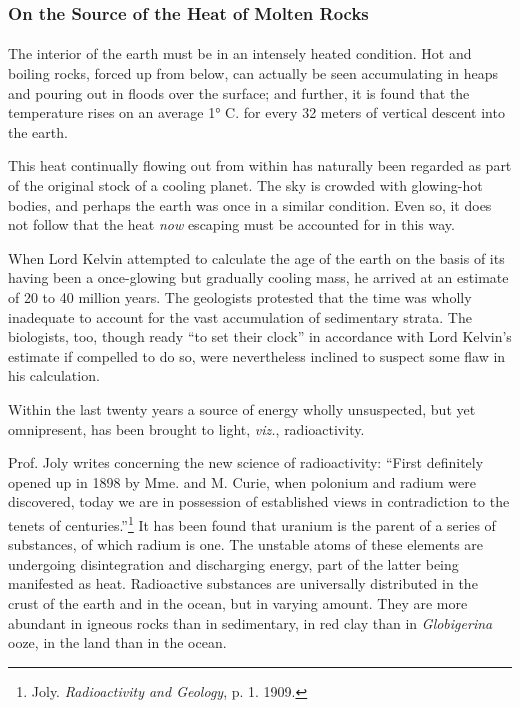 \documentclass[a4paper, 12pt, oneside, landscape]{article}
\begin{document}
\subsubsection{On the Source of the Heat of Molten Rocks}
\paragraph{}
The interior of the earth must be in an intensely heated condition. Hot and boiling rocks, forced up from below, can actually be seen accumulating in heaps and pouring out in floods over the surface; and further, it is found that the temperature rises on an average 1° C. for every 32 meters of vertical descent into the earth.

This heat continually flowing out from within has naturally been regarded as part of the original stock of a cooling planet. The sky is crowded with glowing-hot bodies, and perhaps the earth was once in a similar condition. Even so, it does not follow that the heat \emph{now} escaping must be accounted for in this way.

When Lord Kelvin attempted to calculate the age of the earth on the basis of its having been a once-glowing but gradually cooling mass, he arrived at an estimate of 20 to 40 million years. The geologists protested that the time was wholly inadequate to account for the vast accumulation of sedimentary strata. The biologists, too, though ready ``to set their clock'' in accordance with Lord Kelvin's estimate if compelled to do so, were nevertheless inclined to suspect some flaw in his calculation.

Within the last twenty years a source of energy wholly unsuspected, but yet omnipresent, has been brought to light, \emph{viz.}, radioactivity.

Prof. Joly writes concerning the new science of radioactivity: ``First definitely opened up in 1898 by Mme. and M. Curie, when polonium and radium were discovered, today we are in possession of established views in contradiction to the tenets of centuries.''\footnote{Joly. \emph{Radioactivity and Geology}, p. 1. 1909.} It has been found that uranium is the parent of a series of substances, of which radium is one. The unstable atoms of these elements are undergoing disintegration and discharging energy, part of the latter being manifested as heat. Radioactive substances are universally distributed in the crust of the earth and in the ocean, but in varying amount. They are more abundant in igneous rocks than in sedimentary, in red clay than in \emph{Globigerina} ooze, in the land than in the ocean.
\end{document}

